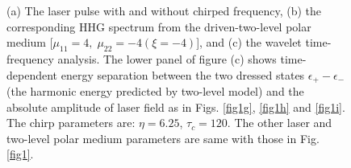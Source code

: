 \documentclass[10pt,letterpaper]{article}
\begin{document}
\begin{figure}[!htbp]
	\centering
	\caption{(a) The laser pulse with and without chirped frequency, (b) the corresponding HHG spectrum from the driven-two-level polar medium [$\mu_{11}=4,\;\mu_{22}=-4(\xi=-4)$], and (c) the wavelet time-frequency analysis. The lower panel of figure (c) shows time-dependent energy separation between the two dressed states $\epsilon_{+}-\epsilon_{-}$ (the harmonic energy predicted by two-level model) and the absolute amplitude of laser field as in Figs. \ref{fig1g}, \ref{fig1h} and \ref{fig1i}. The chirp parameters are: $\eta=6.25$, $\tau_c=120$. The other laser and two-level polar medium parameters are same with those in Fig. \ref{fig1}.}
	\label{fig2}
\end{figure}
\end{document}
